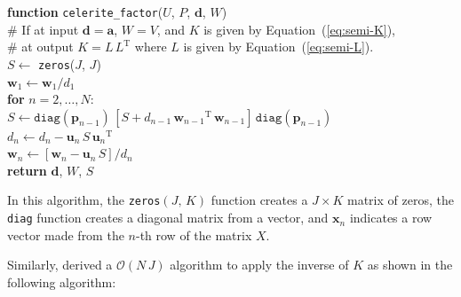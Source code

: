 \documentclass[rnaas]{aastex62}
\renewcommand{\eqref}[1]{\ref{eq:#1}}
\newcommand{\Eq}[1]{Equation~(\eqref{#1})}
\newcommand{\T}{\ensuremath{\mathrm{T}}}
\newcommand{\bvec}[1]{{\ensuremath{\boldsymbol{#1}}}}
\begin{document}
\medskip
\begin{minipage}{\linewidth}
\textbf{function} \texttt{celerite\_factor}($U$, $P$, $\bvec{d}$, $W$) \\
\hspace*{2em}\textsf{\# If at input $\bvec{d} = \bvec{a}$, $W = V$, and $K$ is
    given by \Eq{semi-K},} \\
\hspace*{2em}\textsf{\# at output $K = L\,L^\T$ where $L$ is given by
    \Eq{semi-L}.} \\
\hspace*{2em}$S \gets$ \texttt{zeros}($J$, $J$) \\
    \hspace*{2em}$\bvec{w}_1 \gets \bvec{w}_1 / d_{1}$ \\
\hspace*{2em}\textbf{for} $n = 2,\ldots,N$:\\
\hspace*{2em}\hspace*{2em}$S \gets \texttt{diag}(\bvec{p}_{n-1})\,[
    S + d_{n-1}\,{\bvec{w}_{n-1}}^\T\,{\bvec{w}_{n-1}}
]\,\texttt{diag}(\bvec{p}_{n-1})$ \\
\hspace*{2em}\hspace*{2em}$d_{n} \gets d_{n} - \bvec{u}_n\,S\,{\bvec{u}_n}^\T$\\
\hspace*{2em}\hspace*{2em}$\bvec{w}_n \gets \left[\bvec{w}_n -
    \bvec{u}_n\,S \right] / d_{n}$\\
    \hspace*{2em}\textbf{return} $\bvec{d}$, $W$, $S$
\end{minipage}
\medskip

\noindent In this algorithm, the \texttt{zeros}$(J,\,K)$ function creates a $J
\times K$ matrix of zeros, the \texttt{diag} function creates a diagonal
matrix from a vector, and $\bvec{x}_n$ indicates a row vector made from the
$n$-th row of the matrix $X$.

Similarly, \citet{Foreman-Mackey:2017} derived a $\mathcal{O}(N\,J)$ algorithm
to apply the inverse of $K$ as shown in the following algorithm:
\end{document}

